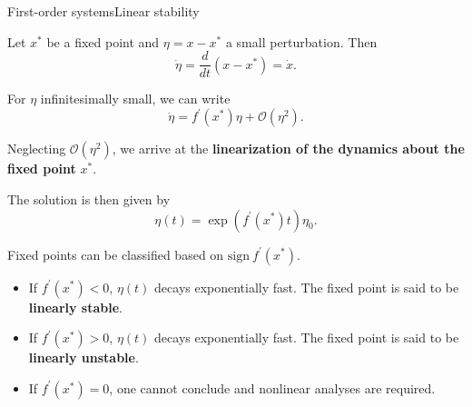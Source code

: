 \documentclass[usenames,dvipsnames,svgnames,10pt,aspectratio=169]{beamer}
\begin{document}
\begin{frame}[t, c]{First-order systems}{Linear stability}
  \begin{minipage}{.58\textwidth}
    \begin{overprint}
      Let $x^*$ be a fixed point and $\eta = x - x^*$ a small perturbation.
      Then
      \[ \dot{\eta} = \dfrac{d}{dt}(x - x^*) = \dot{x}. \]

      \medskip

      For $\eta$ infinitesimally small, we can write
      \[
      \dot{\eta} = f^{\prime}(x^*) \eta + \mathcal{O}(\eta^2).
      \]

      Neglecting $\mathcal{O}(\eta^2)$, we arrive at the \textbf{linearization of the dynamics about the fixed point} $x^*$.

      The solution is then given by
      \[
      \eta(t) = \exp \left( f^{\prime}(x^*) t \right) \eta_0.
      \]

      Fixed points can be classified based on $\mathrm{sign}\ f^{\prime}(x^*)$.

      \begin{itemize}
      \item If $f^{\prime}(x^*) < 0$, $\eta(t)$ decays exponentially fast.
        The fixed point is said to be \textbf{linearly stable}.

        \medskip

      \item If $f^{\prime}(x^*) > 0$, $\eta(t)$ decays exponentially fast.
        The fixed point is said to be \textbf{linearly unstable}.

        \medskip

      \item If $f^{\prime}(x^*) = 0$, one cannot conclude and nonlinear analyses are required.

      \end{itemize}
    \end{overprint}
  \end{minipage}
  \hfill
  \begin{minipage}{.38\textwidth}
    \centering
\end{minipage}
\end{frame}
\end{document}
